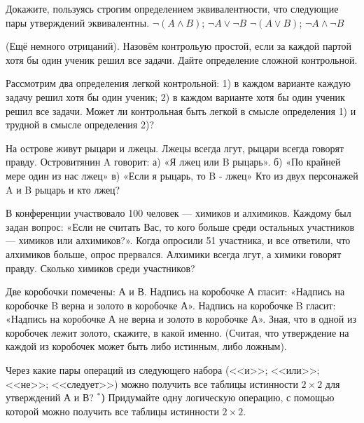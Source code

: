 \documentclass[12pt]{article}
\newcommand{\pstar}[1][]{\refstepcounter{pnum}{\immediate\write\tempfile{\arabic{znum}.\arabic{pnum}.\pstyle.\if\relax\detokenize{#1}\relax\zprev\else#1\fi}} {\bf\thepnum}$^{\mbox{#1}*}${\bf{)}$\;$}}
\begin{document}

\z  Докажите, пользуясь строгим определением эквивалентности, что следующие пары утверждений эквивалентны.
	\p $\lnot(A\land B)$; $\lnot A \lor \lnot B$ %
	\p $\lnot(A\lor B)$; $\lnot A \land \lnot B$ %
	
\z (Ещё немного отрицаний). Назовём контрольую простой, если за каждой партой хотя бы один ученик решил все задачи. Дайте определение сложной контрольной.

\z Рассмотрим два определения легкой контрольной: 1) в каждом варианте каждую задачу решил хотя бы один ученик; 2) в каждом варианте хотя бы один ученик решил все задачи. Может ли контрольная быть легкой в смысле определения 1) и трудной в смысле определения 2)?

\z На острове живут рыцари и лжецы. Лжецы всегда лгут, рыцари всегда говорят правду. Островитянин A говорит:
а) «Я лжец или B рыцарь».
б) «По крайней мере один из нас лжец»
в) «Если я рыцарь, то B - лжец»
Кто из двух персонажей A и B рыцарь и кто лжец? 

\z В конференции участвовало 100 человек --- химиков и алхимиков. Каждому был задан вопрос: «Если не считать Вас, то кого больше среди остальных участников --- химиков или алхимиков?». Когда опросили 51 участника, и все ответили, что алхимиков больше, опрос прервался. Алхимики всегда лгут, а химики говорят правду. Сколько химиков среди участников? 

\z      Две коробочки помечены: А и В. Надпись на коробочке А гласит: «Надпись на коробочке B верна и золото в коробочке А». Надпись на коробочке B гласит: «Надпись на коробочке А не верна и золото в коробочке А». Зная, что в одной из коробочек лежит золото, скажите, в какой именно. (Считая, что утверждение на каждой из коробочек может быть либо истинным, либо ложным).

\z \p Через какие пары операций из следующего набора (<<и>>; <<или>>; <<не>>; <<следует>>) можно получить все таблицы истинности $2\times2$ для утверждений А и В?
	\pstar Придумайте одну логическую операцию, с помощью которой можно получить все таблицы истинности $2\times2$.
\end{document}
